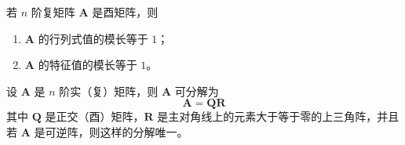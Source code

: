 \begin{theorem}
  若 $n$ 阶复矩阵 $\bm{A}$ 是酉矩阵，则
  \begin{enumerate}
    \item $\bm{A}$ 的行列式值的模长等于 $1$；
    \item $\bm{A}$ 的特征值的模长等于 $1$。
  \end{enumerate}
\end{theorem}

\begin{theorem}
  设 $\bm{A}$ 是 $n$ 阶实（复）矩阵，则 $\bm{A}$ 可分解为
  \[
      \bm{A} = \bm{QR}
  \]
  其中 $\bm{Q}$ 是正交（酉）矩阵，$\bm{R}$ 是主对角线上的元素大于等于零的上三角阵，并且若 $\bm{A}$ 是可逆阵，则这样的分解唯一。
\end{theorem}



\section{}







\section{}







\section{}







\section{}







\section{}






